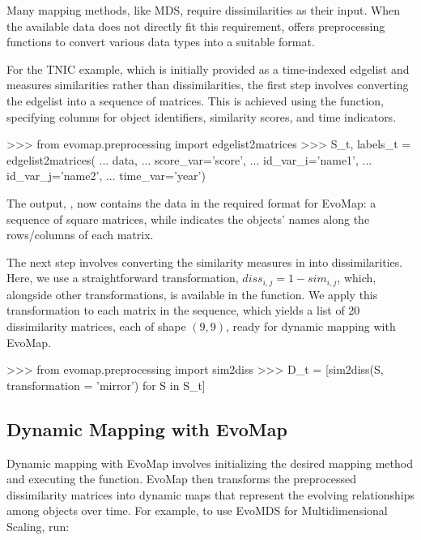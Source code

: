 \documentclass[article]{jss}
\begin{document}
Many mapping methods, like MDS, require dissimilarities as their input. When the available data 
does not directly fit this requirement,  offers preprocessing functions to convert various 
data types into a suitable format. 

For the TNIC example, which is initially provided as a time-indexed edgelist and measures 
similarities rather than dissimilarities, the first step involves converting the edgelist 
into a sequence of matrices. This is achieved using the  function,
specifying columns for object identifiers, similarity scores, and time indicators. 

\begin{Code}
>>> from evomap.preprocessing import edgelist2matrices
>>> S_t, labels_t = edgelist2matrices(
...     data,
...     score_var='score',
...     id_var_i='name1',
...     id_var_j='name2',
...     time_var='year')  
\end{Code}

The output, , now contains the data in the required format for EvoMap: a sequence of square matrices, 
while  indicates the objects' names along the rows/columns of each matrix.

The next step involves converting the similarity measures in  into dissimilarities. 
Here, we use a straightforward transformation, $diss_{i,j} = 1 - sim_{i,j}$, which, alongside 
other transformations, is available in the  function. 
We apply this transformation to each matrix in the sequence, which yields a list of 20 dissimilarity matrices, 
each of shape $(9,9)$, ready for dynamic mapping with EvoMap.

\begin{Code}
>>> from evomap.preprocessing import sim2diss
>>> D_t = [sim2diss(S, transformation = 'mirror') for S in S_t]
\end{Code}
  
\subsection{Dynamic Mapping with EvoMap}

Dynamic mapping with EvoMap involves initializing the desired mapping method and executing the  
function. EvoMap then transforms the preprocessed dissimilarity matrices into dynamic maps that represent the evolving 
relationships among objects over time. For example, to use EvoMDS for Multidimensional Scaling, run:
\end{document}
